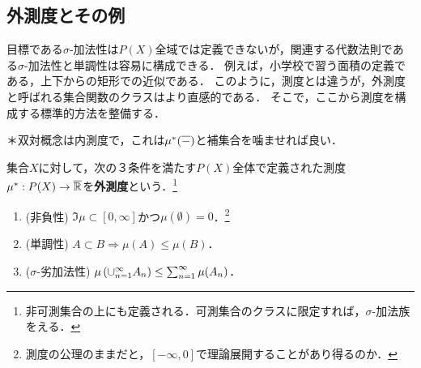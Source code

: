 \documentclass[uplatex, dvipdfmx]{jsreport}
\begin{document}

\subsection{外測度とその例}

\begin{tcolorbox}[colframe=ForestGreen, colback=ForestGreen!10!white,breakable,colbacktitle=ForestGreen!40!white,coltitle=black,fonttitle=\bfseries\sffamily,
title=外測度：測度の面積への応用の王道＝被覆による面積近似]
    目標である$\sigma$-加法性は$P(X)$全域では定義できないが，関連する代数法則である$\sigma$-加法性と単調性は容易に構成できる．
    例えば，小学校で習う面積の定義である，上下からの矩形での近似である．
    このように，測度とは違うが，外測度と呼ばれる集合関数のクラスはより直感的である．
    そこで，ここから測度を構成する標準的方法を整備する．
    
    ＊双対概念は内測度で，これは$\mu^*(\overline{-})$と補集合を噛ませれば良い．
\end{tcolorbox}

\begin{definition}
    集合$X$に対して，次の３条件を満たす$P(X)$全体で定義された測度$\mu^*:P(X)\to\overline{\mathbb{R}}$を\textbf{外測度}という．\footnote{非可測集合の上にも定義される．可測集合のクラスに限定すれば，$\sigma$-加法族をえる．}
    \begin{enumerate}
        \item (非負性) $\Im\mu\subset[0,\infty]$かつ$\mu(\emptyset)=0$．\footnote{測度の公理のままだと，$[-\infty,0]$で理論展開することがあり得るのか．}
        \item (単調性) $A\subset B\Rightarrow \mu(A)\le\mu(B)$．
        \item ($\sigma$-劣加法性) $\mu\left(\cup_{n=1}^\infty A_n\right)\le\sum^\infty_{n=1}\mu(A_n)$．
    \end{enumerate}
\end{definition}
\end{document}
